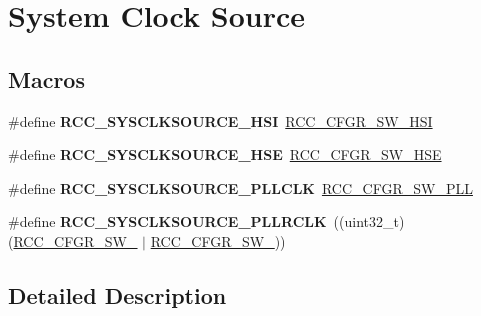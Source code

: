 \hypertarget{group___r_c_c___system___clock___source}{}\section{System Clock Source}
\label{group___r_c_c___system___clock___source}
\subsection*{Macros}
\begin{DoxyCompactItemize}
\item 
\#define {\bfseries R\+C\+C\+\_\+\+S\+Y\+S\+C\+L\+K\+S\+O\+U\+R\+C\+E\+\_\+\+H\+SI}~\hyperlink{group___peripheral___registers___bits___definition_gacbac8bae4f0808b3c3a5185aa10081fb}{R\+C\+C\+\_\+\+C\+F\+G\+R\+\_\+\+S\+W\+\_\+\+H\+SI}\hypertarget{group___r_c_c___system___clock___source_gaaeeb699502e7d7a9f1b5d57fcf1f5095}{}\label{group___r_c_c___system___clock___source_gaaeeb699502e7d7a9f1b5d57fcf1f5095}

\item 
\#define {\bfseries R\+C\+C\+\_\+\+S\+Y\+S\+C\+L\+K\+S\+O\+U\+R\+C\+E\+\_\+\+H\+SE}~\hyperlink{group___peripheral___registers___bits___definition_gafb563f217242d969f4355d0818fde705}{R\+C\+C\+\_\+\+C\+F\+G\+R\+\_\+\+S\+W\+\_\+\+H\+SE}\hypertarget{group___r_c_c___system___clock___source_ga9116d0627e1e7f33c48e1357b9a35a1c}{}\label{group___r_c_c___system___clock___source_ga9116d0627e1e7f33c48e1357b9a35a1c}

\item 
\#define {\bfseries R\+C\+C\+\_\+\+S\+Y\+S\+C\+L\+K\+S\+O\+U\+R\+C\+E\+\_\+\+P\+L\+L\+C\+LK}~\hyperlink{group___peripheral___registers___bits___definition_ga87389cacb2eaf53730da13a2a33cd487}{R\+C\+C\+\_\+\+C\+F\+G\+R\+\_\+\+S\+W\+\_\+\+P\+LL}\hypertarget{group___r_c_c___system___clock___source_ga5caf08ac71d7dd7e7b2e3e421606aca7}{}\label{group___r_c_c___system___clock___source_ga5caf08ac71d7dd7e7b2e3e421606aca7}

\item 
\#define {\bfseries R\+C\+C\+\_\+\+S\+Y\+S\+C\+L\+K\+S\+O\+U\+R\+C\+E\+\_\+\+P\+L\+L\+R\+C\+LK}~((uint32\+\_\+t)(\hyperlink{group___peripheral___registers___bits___definition_ga99f08d86fd41824058a7fdf817f7e2fd}{R\+C\+C\+\_\+\+C\+F\+G\+R\+\_\+\+S\+W\+\_} $\vert$ \hyperlink{group___peripheral___registers___bits___definition_ga72d51cb5d66ee1aa4d2c6f14796a072f}{R\+C\+C\+\_\+\+C\+F\+G\+R\+\_\+\+S\+W\+\_}))\hypertarget{group___r_c_c___system___clock___source_ga1fa5dbd16ee193b62cfc42418a62f48d}{}\label{group___r_c_c___system___clock___source_ga1fa5dbd16ee193b62cfc42418a62f48d}

\end{DoxyCompactItemize}


\subsection{Detailed Description}
